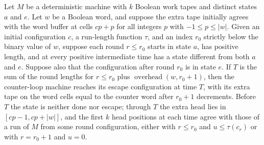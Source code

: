 \begin{theorem}
\label{Turing.counterLoopTMVia_run_escape}
\leanok
{}
Let $M$ be a deterministic machine with $k$ Boolean work tapes and distinct states $a$
and $e$. Let $w$ be a Boolean word, and suppose the extra tape initially agrees with the
word buffer at cells $cp+p$ for all integers $p$ with $-1\le p\le |w|$. Given an
initial configuration $c$, a run-length function $\tau$, and an index $r_0$ strictly
below the binary value of $w$, suppose each round $r\le r_0$ starts in state $a$, has
positive length, and at every positive intermediate time has a state different from both
$a$ and $e$. Suppose also that the configuration after round $r_0$ is in state $e$. If
$T$ is the sum of the round lengths for $r\le r_0$ plus
$\operatorname{overhead}(w,r_0+1)$, then the counter-loop machine reaches its escape
configuration at time $T$, with its extra tape on the word cells equal to the counter
word after $r_0+1$ decrements. Before $T$ the state is neither done nor escape; through
$T$ the extra head lies in $[cp-1,cp+|w|]$, and the first $k$ head positions at each
time agree with those of a run of $M$ from some round configuration, either with $r\le
r_0$ and $u\le\tau(c_r)$ or with $r=r_0+1$ and $u=0$.
\end{theorem}

